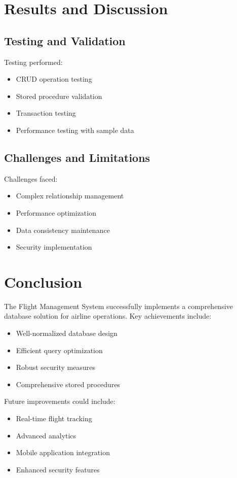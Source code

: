 \documentclass[a4paper,12pt]{article}
\begin{document}
\section{Results and Discussion}
\subsection{Testing and Validation}
Testing performed:
\begin{itemize}
    \item CRUD operation testing
    \item Stored procedure validation
    \item Transaction testing
    \item Performance testing with sample data
\end{itemize}

\subsection{Challenges and Limitations}
Challenges faced:
\begin{itemize}
    \item Complex relationship management
    \item Performance optimization
    \item Data consistency maintenance
    \item Security implementation
\end{itemize}

\section{Conclusion}
The Flight Management System successfully implements a comprehensive database solution for airline operations. Key achievements include:
\begin{itemize}
    \item Well-normalized database design
    \item Efficient query optimization
    \item Robust security measures
    \item Comprehensive stored procedures
\end{itemize}

Future improvements could include:
\begin{itemize}
    \item Real-time flight tracking
    \item Advanced analytics
    \item Mobile application integration
    \item Enhanced security features
\end{itemize}

\raggedbottom
\end{document}
